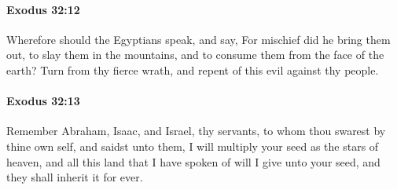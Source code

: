 		\paragraph{Exodus 32:12} %
			\label{EXODUS-32-12}

			Wherefore should the Egyptians speak, and say, For mischief did he bring them out, to slay them in the mountains, and to consume them from the face of the earth? Turn from thy fierce wrath, and repent of this evil against thy people.


		\paragraph{Exodus 32:13} %
			\label{EXODUS-32-13}

			Remember Abraham, Isaac, and Israel, thy servants, to whom thou swarest by thine own self, and saidst unto them, I will multiply your seed as the stars of heaven, and all this land that I have spoken of will I give unto your seed, and they shall inherit it for ever.

